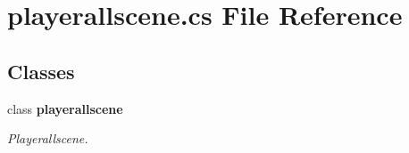 \section{playerallscene.\+cs File Reference}
\label{playerallscene_8cs}
\subsection*{Classes}
\begin{DoxyCompactItemize}
\item 
class {\bf playerallscene}
\begin{DoxyCompactList}\small\item\em Playerallscene. \end{DoxyCompactList}\end{DoxyCompactItemize}
